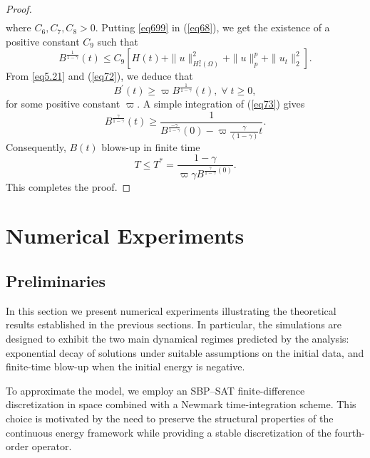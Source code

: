 \documentclass[12pt]{article}
\numberwithin{equation}{section}
\begin{document}
\begin{proof}
\begin{eqnarray}
\end{eqnarray}
where $C_6, C_7, C_8>0$. Putting \eqref{eq699} in (\ref{eq68}), we get the existence of a positive constant $C_9$ such that
\begin{equation}\label{eq72}
B^{\frac{1}{1-\gamma}}(t) \leq C_9\left[H(t)+\|u\|_{H^2_*(\Omega)}^{2}+\|u\|_{p}^{p}+\|u_{t}\|_{2}^{2}\right].
\end{equation}
From \eqref{eq5.21} and (\ref{eq72}), we deduce that
\begin{equation}
B^{\prime}(t) \geq \varpi B^{\frac{1}{1-\gamma}}(t),\;\forall\;t\geq 0,
\label{eq73}
\end{equation}
for some positive constant $\varpi$.
A simple integration of (\ref{eq73}) gives
$$
B^{\frac{\gamma}{1-\gamma}}(t) \geq \frac{1}{B^{\frac{-\gamma}{1-\gamma}}(0)-\varpi \frac{\gamma}{(1-\gamma)} t}.
$$
Consequently, $B(t)$ blows-up in finite time
$$
T \leq T^{*}=\frac{1-\gamma}{\varpi \gamma B^{\frac{\gamma}{1-\gamma}(0)}}.
$$
This completes the proof.
\end{proof}
\section{Numerical Experiments}
\label{sec7}
\subsection{Preliminaries}
In this section we present numerical experiments illustrating the theoretical
results established in the previous sections. In particular, the simulations are
designed to exhibit the two main dynamical regimes predicted by the analysis:
exponential decay of solutions under suitable assumptions on the initial data,
and finite-time blow-up when the initial energy is negative.

To approximate the model, we employ an SBP--SAT finite-difference
discretization in space combined with a Newmark time-integration scheme.
This choice is motivated by the need to preserve the structural properties
of the continuous energy framework while providing a stable discretization
of the fourth-order operator.
\end{document}

